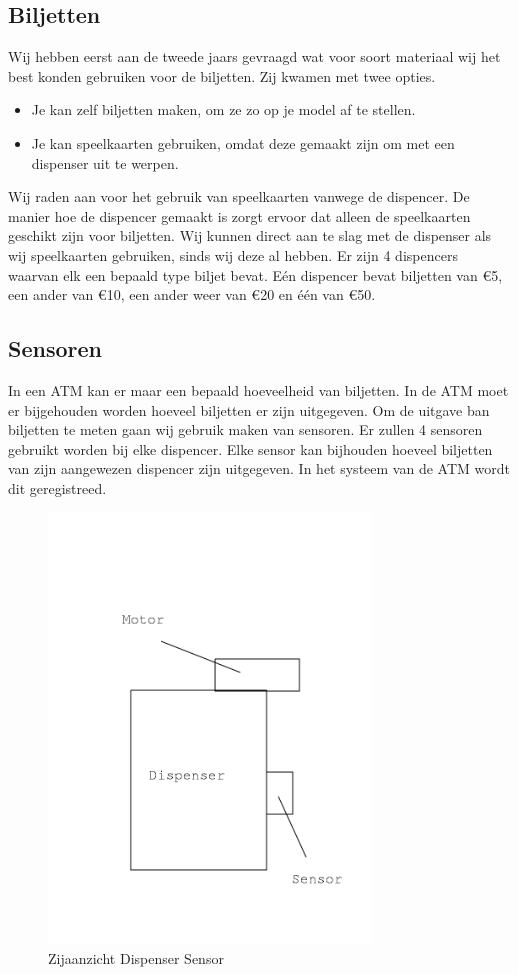 \documentclass{article}
\begin{document}
\subsection{Biljetten}

Wij hebben eerst aan de tweede jaars gevraagd wat voor soort materiaal wij het best konden gebruiken voor de biljetten.
Zij kwamen met twee opties.
\begin{itemize}
\item Je kan zelf biljetten maken, om ze zo op je model af te stellen.
\item Je kan speelkaarten gebruiken, omdat deze gemaakt zijn om met een dispenser uit te werpen.
\end{itemize}

Wij raden aan voor het gebruik van speelkaarten vanwege de dispencer.
De manier hoe de dispencer gemaakt is zorgt ervoor dat alleen de speelkaarten geschikt zijn voor biljetten.
Wij kunnen direct aan te slag met de dispenser als wij speelkaarten gebruiken, sinds wij deze al hebben.
Er zijn 4 dispencers waarvan elk een bepaald type biljet bevat.
E\'en dispencer bevat biljetten van \euro{5},
een ander van \euro{10},
een ander weer van \euro{20} en \'e\'en van \euro{50}.

\newpage

\subsection{Sensoren}
In een ATM kan er maar een bepaald hoeveelheid van biljetten.
In de ATM moet er bijgehouden worden hoeveel biljetten er zijn uitgegeven.
Om de uitgave ban biljetten te meten gaan wij gebruik maken van sensoren.
Er zullen 4 sensoren gebruikt worden bij elke dispencer.
Elke sensor kan bijhouden hoeveel biljetten van zijn aangewezen dispencer zijn uitgegeven.
In het systeem van de ATM wordt dit geregistreed.

\begin{figure}[H]
	\centering
	\includegraphics[height=4.5in]{zijkantdispenser.png}
	\caption{Zijaanzicht Dispenser Sensor}
	\label{fig: Zijaanzicht Dispenser Sensor}
\end{figure}
\end{document}
